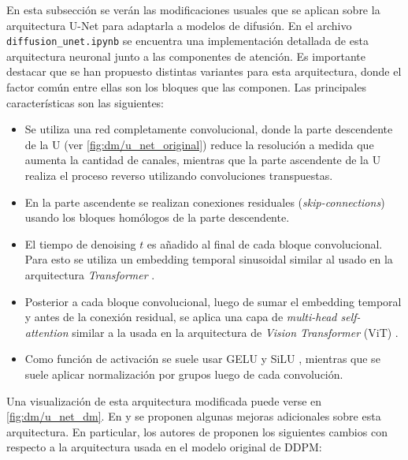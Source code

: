 
En esta subsección se verán las modificaciones usuales que se aplican sobre la arquitectura U-Net para adaptarla a modelos de difusión. En el archivo \texttt{diffusion\_unet.ipynb} se encuentra una implementación detallada de esta arquitectura neuronal junto a las componentes de atención. Es importante destacar que se han propuesto distintas variantes para esta arquitectura, donde el factor común entre ellas son los bloques que las componen. Las principales características son las siguientes:

\begin{itemize}
	\item Se utiliza una red completamente convolucional, donde la parte descendente de la U (ver \autoref{fig:dm/u_net_original}) reduce la resolución a medida que aumenta la cantidad de canales, mientras que la parte ascendente de la U realiza el proceso reverso utilizando convoluciones transpuestas.
	\item En la parte ascendente se realizan conexiones residuales (\textit{skip-connections}) usando los bloques homólogos de la parte descendente.
	\item El tiempo de denoising $t$ es añadido al final de cada bloque convolucional. Para esto se utiliza un embedding temporal sinusoidal similar al usado en la arquitectura \textit{Transformer} \cite{vaswani2023attention}.
	\item Posterior a cada bloque convolucional, luego de sumar el embedding temporal y antes de la conexión residual, se aplica una capa de \textit{multi-head self-attention} similar a la usada en la arquitectura de \textit{Vision Transformer} (ViT) \cite{dosovitskiy2021image}.
	\item Como función de activación se suele usar GELU \cite{hendrycks2023gaussian} y SiLU \cite{elfwing2017sigmoidweighted}, mientras que se suele aplicar normalización por grupos \cite{hafner2018tfdistvae} luego de cada convolución.
\end{itemize}

Una visualización de esta arquitectura modificada puede verse en \autoref{fig:dm/u_net_dm}. En \cite{nichol2021improved} y \cite{dhariwal2021diffusion} se proponen algunas mejoras adicionales sobre esta arquitectura. En particular, los autores de \cite{dhariwal2021diffusion} proponen los siguientes cambios con respecto a la arquitectura usada en el modelo original de DDPM:

